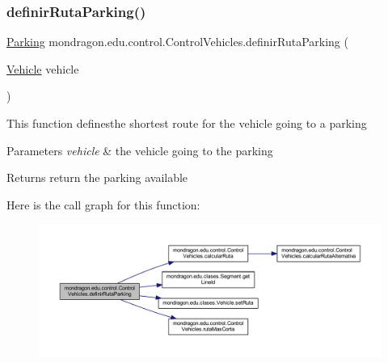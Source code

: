 \subsubsection{\texorpdfstring{definirRutaParking()}{definirRutaParking()}}
{\footnotesize\ttfamily \mbox{\hyperlink{classmondragon_1_1edu_1_1clases_1_1_parking}{Parking}} mondragon.\+edu.\+control.\+Control\+Vehicles.\+definir\+Ruta\+Parking (\begin{DoxyParamCaption}\item[{\mbox{\hyperlink{classmondragon_1_1edu_1_1clases_1_1_vehicle}{Vehicle}}}]{vehicle }\end{DoxyParamCaption})\hspace{0.3cm}{\ttfamily [inline]}}

This function definesthe shortest route for the vehicle going to a parking


\begin{DoxyParams}{Parameters}
{\em vehicle} & the vehicle going to the parking \\
\hline
\end{DoxyParams}
\begin{DoxyReturn}{Returns}
return the parking available 
\end{DoxyReturn}
Here is the call graph for this function\+:\nopagebreak
\begin{figure}[H]
\begin{center}
\leavevmode
\includegraphics[width=350pt]{classmondragon_1_1edu_1_1control_1_1_control_vehicles_a4ea8338d43962d68e7c29bad88cfbcf3_cgraph}
\end{center}
\end{figure}
\mbox{\label{classmondragon_1_1edu_1_1control_1_1_control_vehicles_ac45999cf276055a6695eaf35cf781775}} 
